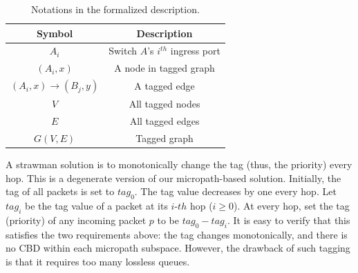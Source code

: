
\begin{table}
\small
\centering
\begin{tabular}{|c|c|}
\hline
Symbol & Description \\ \hline
$A_i$ & Switch $A$'s $i^{th}$ ingress port  \\ \hline
$(A_i, x)$ & A node in tagged graph \\ \hline
$(A_i, x)\rightarrow(B_j, y)$ & A tagged edge \\ \hline
$V$ & All tagged nodes  \\ \hline
$E$ & All tagged edges \\ \hline
$G(V, E)$ & Tagged graph \\ \hline
\end{tabular}
\caption{Notations in the formalized description.}
\label{tab:symbols}
\end{table}

 A strawman solution is to monotonically change the tag (thus, the priority) every hop.
This is a degenerate version of our micropath-based solution.
Initially, the tag of all packets is set to $tag_0$. The tag value decreases by one every hop. 
Let $tag_i$ be the tag value of a packet at its $i$-$th$ hop ($i \geq 0$). At every hop, 
set the tag (priority) of any incoming packet $p$ to be $tag_0 - tag_i$. 
It is easy to verify that this satisfies the two requirements above: the tag changes monotonically, and there is no CBD
within each micropath subspace.
However, the drawback of such tagging is that it requires too many lossless queues. 
\fi



